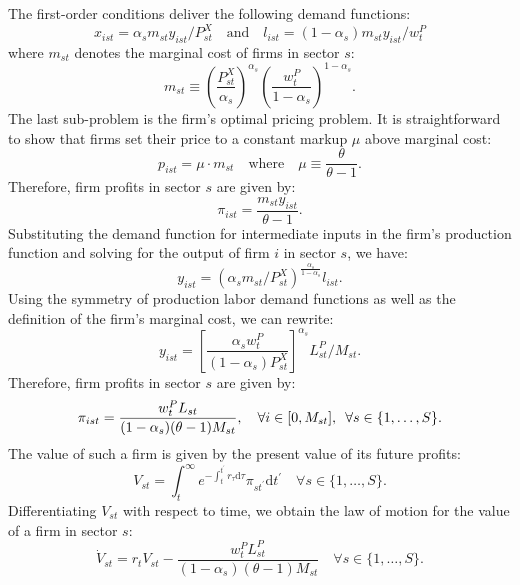 \documentclass[12pt]{article}
\newcommand{\smallquad}{\hspace{0.5em}}
\begin{document}
The first-order conditions deliver the following demand functions:
\begin{equation*}
    x_{ist} = \alpha_s m_{st} y_{ist} / P_{st}^X \quad \text{and} \quad l_{ist} = (1 - \alpha_s) m_{st} y_{ist} / w_t^P
\end{equation*}
where $m_{st}$ denotes the marginal cost of firms in sector $s$:
\begin{equation*}
    m_{st} \equiv \left(\frac{P_{st}^X}{\alpha_s}\right)^{\alpha_s} \left(\frac{w_t^P}{1 - \alpha_s}\right)^{1 - \alpha_s}.
\end{equation*}
The last sub-problem is the firm's optimal pricing problem. It is straightforward to show that firms set their price to a constant markup $\mu$ above marginal cost:
\begin{equation*}
    p_{ist} = \mu \cdot m_{st} \quad \text{where} \quad \mu \equiv \frac{\theta}{\theta - 1}.
\end{equation*}
Therefore, firm profits in sector $s$ are given by:
\begin{equation*}
    \pi_{ist} = \frac{m_{st} y_{ist}}{\theta - 1}.
\end{equation*}
Substituting the demand function for intermediate inputs in the firm's production function and solving for the output of firm $i$ in sector $s$, we have:
\begin{equation*}
    y_{ist} = (\alpha_s m_{st} / P_{st}^X)^{\frac{\alpha_s}{1 - \alpha_s}} l_{ist}.
\end{equation*}
Using the symmetry of production labor demand functions as well as the definition of the firm's marginal cost, we can rewrite:
\begin{equation*}
    y_{ist} = \left[\frac{\alpha_s w_t^P}{(1 - \alpha_s) P_{st}^X}\right]^{\alpha_s} L_{st}^P / M_{st}.
\end{equation*}
Therefore, firm profits in sector $s$ are given by:
\begin{equation*}
    \pi_{ist} = \frac{w_t^P L_{st}}{(1 - \alpha_s) (\theta - 1) M_{st}}, \quad \forall i \in [0, M_{st}], \smallquad \forall s \in \{1, \ldots, S\}.
\end{equation*}
The value of such a firm is given by the present value of its future profits:
\begin{equation*}
    V_{st} = \int_t^{\infty} e^{-\int_t^{t^{\prime}} r_{\tau} \text{d}\tau} \pi_{st^{\prime}} \text{d}t^{\prime} \quad \forall s \in \{1, \ldots, S\}.
\end{equation*}
Differentiating $V_{st}$ with respect to time, we obtain the law of motion for the value of a firm in sector $s$:
\begin{equation*}
    \dot{V}_{st} = r_t V_{st} - \frac{w_t^P L_{st}^P}{(1 - \alpha_s) (\theta - 1) M_{st}} \quad \forall s \in \{1, \ldots, S\}.
\end{equation*}
\end{document}
